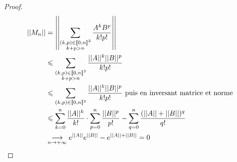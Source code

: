 \begin{proof}
    \begin{align*}
        ||M_n|| & = \left|\left| \sum_{\substack{(k, p) \in [\![0, n]\!]^2 \\ k + p > n}} \frac{A^k B^p}{k! p!} \right|\right| \\
                & \leqslant \sum_{\substack{(k, p) \in [\![0, n]\!]^2 \\ k + p > n}} \frac{||A||^k ||B||^p}{k! p!} \\
                & \leqslant \sum_{(k, p) \in [\![0, n]\!]^2} \frac{||A||^k ||B||^p}{k! p!} \text{ puis en inversant matrice et norme } \\
                & \leqslant \sum_{k = 0 }^{n} \frac{||A||^k}{k!} \cdot \sum_{p = 0 }^{n } \frac{||B||^p}{p!} - \sum_{q = 0}^n  \frac{(||A || + ||B||)^q}{q!} \\
                & \underset{n \to + \infty}{\longrightarrow} e^{||A||} e^{||B||} - e^{||A|| + ||B||} = 0
    \end{align*}
\end{proof}
